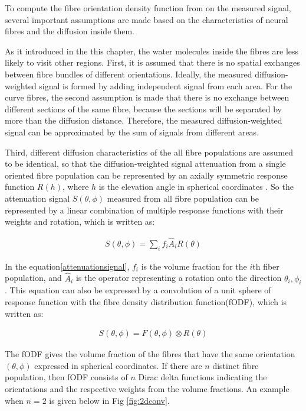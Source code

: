 To compute the fibre orientation density function from on the measured signal, several important assumptions are made based on the characteristics of neural fibres and the diffusion inside them. 

As it introduced in the this chapter, the water molecules inside the fibres are less likely to visit other regions. First, it is assumed that there is 
no spatial exchanges between fibre bundles of different orientations. Ideally, the measured diffusion-weighted signal is formed by adding
independent signal from each area. For the curve fibres, the second assumption is made that there is no exchange between different sections of the same fibre, because
the sections will be separated by more than the diffusion distance. Therefore, the measured diffusion-weighted signal can be approximated by the sum of signals from 
different areas.

Third, different diffusion characteristics of the all fibre populations are assumed to be identical, so that the diffusion-weighted signal attenuation 
from a single oriented fibre population can be represented by an axially symmetric response function $R(h)$, where $h$ is the elevation angle in spherical coordinates \cite{tournierDirectEstimationFiber2004}. 
So the attenuation signal $S(\theta, \phi)$ measured from all fibre population can be represented by a linear combination of multiple response functions with their weights and rotation, which is written as:

\begin{gather}\label{attenuationsignal}  
    S(\theta, \phi) = \sum_{i}^{}f_{i}\hat{A}_{i}R(\theta)
\end{gather}

In the equation\ref*{attenuationsignal},  $f_{i}$ is the volume fraction for the $i$th fiber population, and $\hat{A}_{i}$ is the operator representing a rotation onto the direction $\theta_{i}, \phi_{i}$ \cite{tournierDirectEstimationFiber2004}.
This equation can also be expressed by a convolution of a unit sphere of response function with the fibre density distribution function(fODF), which is written as:

\begin{gather}\label{convo}  
    S(\theta ,\phi ) = F(\theta ,\phi ) \otimes R(\theta)
\end{gather}

The fODF gives the volume fraction of the fibres that have the same orientation $(\theta, \phi)$ expressed in spherical coordinates. 
If there are $n$ distinct fibre population, then fODF consists of $n$ Dirac delta functions indicating the orientations and the respective weights
from the volume fractions. An example when $n = 2$ is given below in Fig \ref{fig:2dconv}. 

